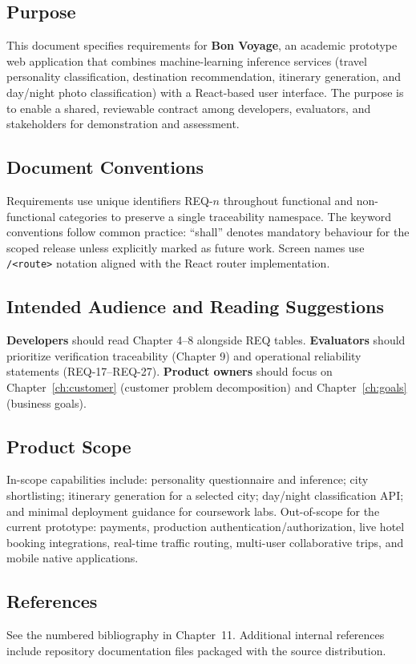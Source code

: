 \documentclass[12pt,oneside,openany]{report}
\begin{document}
\subsection{Purpose}
This document specifies requirements for \textbf{Bon Voyage}, an academic prototype web application that combines machine-learning inference services (travel personality classification, destination recommendation, itinerary generation, and day/night photo classification) with a React-based user interface. The purpose is to enable a shared, reviewable contract among developers, evaluators, and stakeholders for demonstration and assessment.

\subsection{Document Conventions}
Requirements use unique identifiers REQ-$n$ throughout functional and non-functional categories to preserve a single traceability namespace. The keyword conventions follow common practice: ``shall'' denotes mandatory behaviour for the scoped release unless explicitly marked as future work. Screen names use \texttt{/<route>} notation aligned with the React router implementation.

\subsection{Intended Audience and Reading Suggestions}
\textbf{Developers} should read Chapter 4--8 alongside REQ tables. \textbf{Evaluators} should prioritize verification traceability (Chapter 9) and operational reliability statements (REQ-17--REQ-27). \textbf{Product owners} should focus on Chapter~\ref{ch:customer} (customer problem decomposition) and Chapter~\ref{ch:goals} (business goals).

\subsection{Product Scope}
In-scope capabilities include: personality questionnaire and inference; city shortlisting; itinerary generation for a selected city; day/night classification API; and minimal deployment guidance for coursework labs. Out-of-scope for the current prototype: payments, production authentication/authorization, live hotel booking integrations, real-time traffic routing, multi-user collaborative trips, and mobile native applications.

\subsection{References}
See the numbered bibliography in Chapter~11. Additional internal references include repository documentation files packaged with the source distribution.
\end{document}
